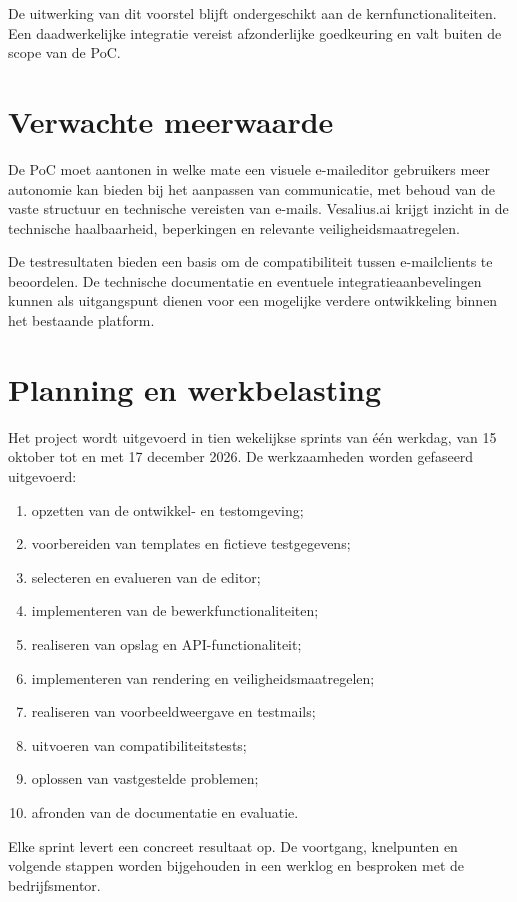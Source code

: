 De uitwerking van dit voorstel blijft ondergeschikt aan de
kernfunctionaliteiten. Een daadwerkelijke integratie vereist
afzonderlijke goedkeuring en valt buiten de scope van de PoC.

\section{Verwachte meerwaarde}
De PoC moet aantonen in welke mate een visuele e-maileditor gebruikers
meer autonomie kan bieden bij het aanpassen van communicatie, met behoud
van de vaste structuur en technische vereisten van e-mails. Vesalius.ai
krijgt inzicht in de technische haalbaarheid, beperkingen en relevante
veiligheidsmaatregelen.

De testresultaten bieden een basis om de compatibiliteit tussen
e-mailclients te beoordelen. De technische documentatie en eventuele
integratieaanbevelingen kunnen als uitgangspunt dienen voor een mogelijke
verdere ontwikkeling binnen het bestaande platform.

\section{Planning en werkbelasting}
Het project wordt uitgevoerd in tien wekelijkse sprints van één werkdag,
van 15 oktober tot en met 17 december 2026. De werkzaamheden worden
gefaseerd uitgevoerd:

\begin{enumerate}
    \item opzetten van de ontwikkel- en testomgeving;
    \item voorbereiden van templates en fictieve testgegevens;
    \item selecteren en evalueren van de editor;
    \item implementeren van de bewerkfunctionaliteiten;
    \item realiseren van opslag en API-functionaliteit;
    \item implementeren van rendering en veiligheidsmaatregelen;
    \item realiseren van voorbeeldweergave en testmails;
    \item uitvoeren van compatibiliteitstests;
    \item oplossen van vastgestelde problemen;
    \item afronden van de documentatie en evaluatie.
\end{enumerate}

Elke sprint levert een concreet resultaat op. De voortgang, knelpunten
en volgende stappen worden bijgehouden in een werklog en besproken met
de bedrijfsmentor.

